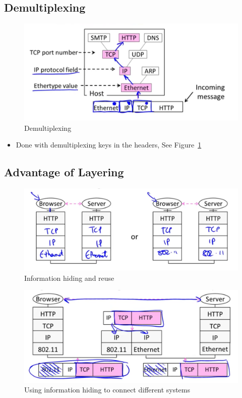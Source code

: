 \documentclass[12pt]{ctexart}   %
\begin{document}
	\subsection{Demultiplexing}
	
	\begin{figure}[h!] %
	 \centering
	 \includegraphics[scale=0.7]{images/1-6-6}
	\caption{ Demultiplexing }
	 \label{fig:1-6-6}
	 \end{figure}
	 
	\begin{itemize}
		\item Done with demultiplexing keys in the headers, See Figure~\ref{fig:1-6-6}
	\end{itemize}
	
	\subsection{Advantage of Layering}
	
	\begin{figure}[h!] %
	 \centering
	 \includegraphics[scale=0.7]{images/1-6-7}
	\caption{ Information hiding and reuse }
	 \label{fig:1-6-7}
	 \end{figure}
	 
	 \begin{figure}[h!] %
	 \centering
	 \includegraphics[scale=0.7]{images/1-6-8}
	\caption{ Using information hiding to connect different systems }
	 \label{fig:1-6-8}
	 \end{figure}
	 
\end{document}
